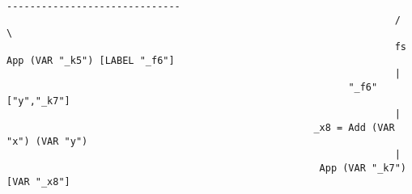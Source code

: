 \begin{landscape}
\begin{lstlisting}[basicstyle=\fontsize{9}{10}\selectfont\ttfamily]
                                                                    ------------------------------
                                                                   /                              \
                                                                   fs               App (VAR "_k5") [LABEL "_f6"]
                                                                   |
                                                           "_f6" ["y","_k7"]
                                                                   |
                                                     _x8 = Add (VAR "x") (VAR "y")
                                                                   |
                                                      App (VAR "_k7") [VAR "_x8"]

\end{lstlisting}
\end{landscape}
\clearpage

